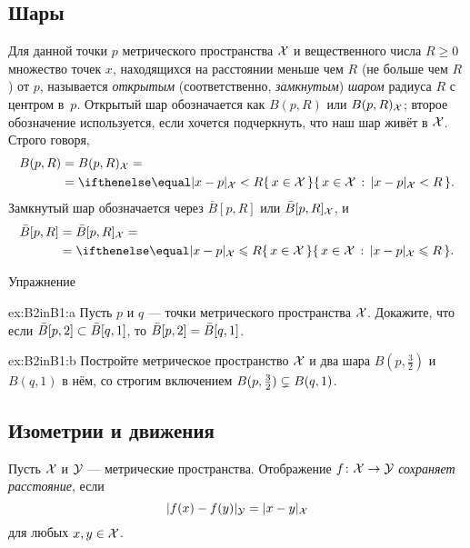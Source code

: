 \begin{multicols}{2}
{{}

\subsection*{Шары}

Для данной точки $p$ метрического пространства $\mathcal{X}$ и вещественного числа $R\ge 0$ множество точек $x$, находящихся на расстоянии меньше чем $R$ (не больше чем $R$) от $p$, называется \emph{открытым} (соответственно, \emph{замкнутым}) \emph{шаром} радиуса $R$ с центром в~$p$.
Открытый шар обозначается как $B(p,R)$ или $B(p,R)_{\mathcal{X}}$;
второе обозначение используется, если хочется подчеркнуть, что наш шар живёт в $\mathcal{X}$.
Строго говоря,
\begin{align*}
B(p,R)&=B(p,R)_{\spc{X}}=
\\
&=\set{x\in \spc{X}}{\dist{x}{p}{\spc{X}}< R}.
\end{align*}
Замкнутый шар обозначается через $\bar B[p,R]$ или $\bar B[p,R]_{\mathcal{X}}$, и
\begin{align*}
\bar B[p,R]&=\bar B[p,R]_{\spc{X}}=
\\
&=\set{x\in \spc{X}}{\dist{x}{p}{\spc{X}}\le R}.
\end{align*}

\begin{thm}{Упражнение}\label{ex:B2inB1}

\begin{subthm}{ex:B2inB1:a}
Пусть $p$ и $q$ --- точки метрического пространства $\mathcal{X}$.
Докажите, что если $\bar B[p,2]\z\subset \bar B[q,1]$, то $\bar B[p,2]\z=\bar B[q,1]$.
\end{subthm}

\begin{subthm}{ex:B2inB1:b}
Постройте метрическое пространство $\mathcal{X}$ и два шара $B(p,\tfrac32)$ и $B(q,1)$ в нём, со строгим включением
$B(p,\tfrac32)\z\subsetneq B(q,1)$.
\end{subthm}

\end{thm}

\subsection*{Изометрии и движения}

Пусть $\mathcal{X}$ и $\mathcal{Y}$ --- метрические пространства.
Отображение $f\:\spc{X} \z\to \spc{Y}$ \emph{сохраняет расстояние}, если 
$$\dist{f(x)}{f(y)}{\spc{Y}}
 = \dist{x}{y}{\spc{X}}$$
для любых $x,y\in {\mathcal{X}}$.

}
\end{multicols}

